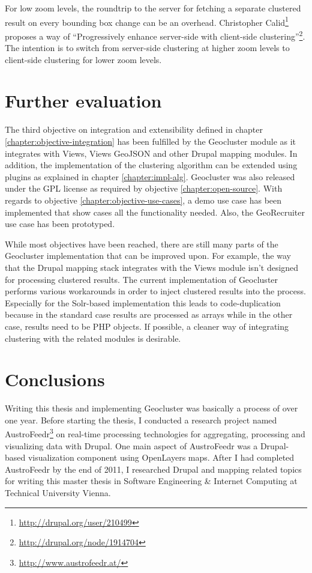 For low zoom levels, the roundtrip to the server for fetching a separate clustered result on every bounding box change can be an overhead. Christopher Calid\footnote{\url{http://drupal.org/user/210499}} proposes a way of ``Progressively enhance server-side with client-side clustering''\footnote{\url{http://drupal.org/node/1914704}}. The intention is to switch from server-side clustering at higher zoom levels to client-side clustering for lower zoom levels.


\section{Further evaluation}

The third objective on integration and extensibility defined in chapter \ref{chapter:objective-integration} has been fulfilled by the Geocluster module as it integrates with Views, Views GeoJSON and other Drupal mapping modules. In addition, the implementation of the clustering algorithm can be extended using plugins as explained in chapter \ref{chapter:impl-alg}. Geocluster was also released under the GPL license as required by objective \ref{chapter:open-source}. With regards to objective \ref{chapter:objective-use-cases}, a demo use case has been implemented that show cases all the functionality needed. Also, the GeoRecruiter use case has been prototyped.
 
While most objectives have been reached, there are still many parts of the Geocluster implementation that can be improved upon. For example, the way that the Drupal mapping stack integrates with the Views module isn't designed for processing clustered results. The current implementation of Geocluster performs various workarounds in order to inject clustered results into the process. Especially for the Solr-based implementation this leads to code-duplication because in the standard case results are processed as arrays while in the other case, results need to be PHP objects. If possible, a cleaner way of integrating clustering with the related modules is desirable.   


\section{Conclusions}

Writing this thesis and implementing Geocluster was basically a process of over one year. Before starting the thesis, I conducted a research project named AustroFeedr\footnote{\url{http://www.austrofeedr.at/}} on real-time processing technologies for aggregating, processing and visualizing data with Drupal. One main aspect of AustroFeedr was a Drupal-based visualization component using OpenLayers maps. After I had completed AustroFeedr by the end of 2011, I researched Drupal and mapping related topics for writing this master thesis in Software Engineering \& Internet Computing at Technical University Vienna.

